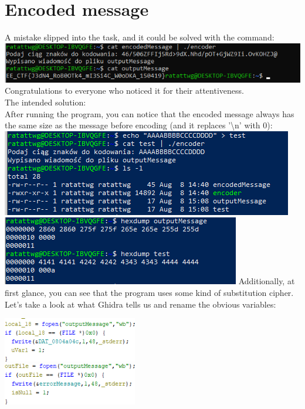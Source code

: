 \documentclass{article}
\begin{document}
\section{Encoded message}
A mistake slipped into the task, and it could be solved with the command:
\vspace{3mm} \\
\includegraphics[width=\textwidth]{"image65.png"}
Congratulations to everyone who noticed it for their attentiveness.
\vspace{3mm} \\
The intended solution:
\vspace{3mm} \\
After running the program, you can notice that the encoded message always has the same size as the message before encoding (and it replaces '\textbackslash n' with 0):
\vspace{3mm} \\
\includegraphics[width=\textwidth]{"image66.png"}
\vspace{3mm}
\includegraphics[width=\textwidth]{"image67.png"}
Additionally, at first glance, you can see that the program uses some kind of substitution cipher. Let’s take a look at what Ghidra tells us and rename the obvious variables:
\begin{multicols}{2}
    \includegraphics[width=0.44\textwidth]{"image68.png"} \\
    \columnbreak
    \includegraphics[width=0.44\textwidth]{"image69.png"}
\end{multicols}
\end{document}
